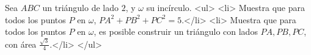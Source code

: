 Sea $ABC$ un triángulo de lado $2$, y $\omega$ su incírculo. 
<ul>
<li> Muestra que para todos los puntos $P$ en $\omega$, 
$PA^2+PB^2+PC^2=5$.</li>
<li> Muestra que para todos los puntos $P$ en $\omega$, es posible construir un triángulo con lados $PA, PB, PC$, con área $\frac{\sqrt{3}}{4}$.</li>
</ul>